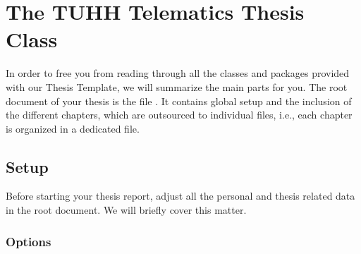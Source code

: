 \chapter{The TUHH Telematics Thesis Class}

In order to free you from reading through all the classes and packages provided with our Thesis Template, we will summarize the main parts for you. The root document of your thesis is the file . It contains global setup and the inclusion of the different chapters, which are outsourced to individual files, i.e., each chapter is organized in a dedicated file.

\section{Setup}

Before starting your thesis report, adjust all the personal and thesis related data in the root document. We will briefly cover this matter.


\subsection{Options}\label{sub:options}

